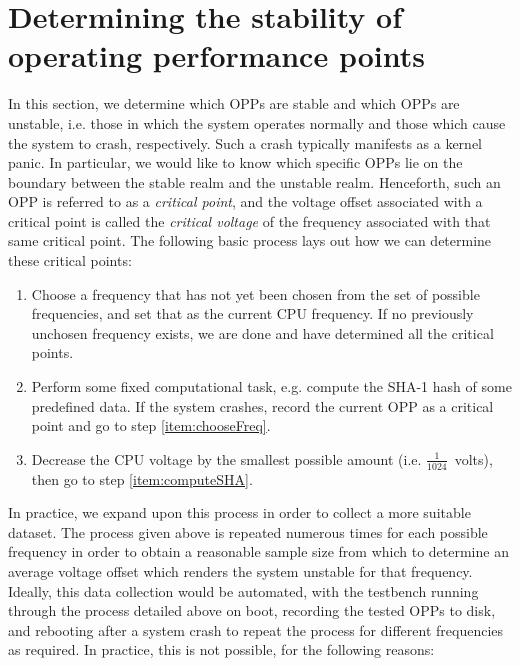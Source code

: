 \section{Determining the stability of operating performance points}
\label{sec:unstableOPPs}

In this section, we determine which OPPs are stable and which OPPs are unstable,
i.e. those in which the system operates normally and those which cause the system
to crash, respectively. Such a crash typically manifests as a kernel panic.
In particular, we would like to know which specific OPPs lie on the boundary
between the stable realm and the unstable realm. Henceforth, such an OPP is
referred to as a \textit{critical point}, and the voltage offset associated
with a critical point is called the \textit{critical voltage} of the frequency
associated with that same critical point. The following basic process lays out
how we can determine these critical points:

\begin{enumerate}
    \item \label{item:chooseFreq} Choose a frequency that has not yet been
        chosen from the set of possible frequencies, and set that as the current
        CPU frequency. If no previously unchosen frequency exists, we are done
        and have determined all the critical points.
    \item \label{item:computeSHA} Perform some fixed computational task, e.g.
        compute the SHA-1 hash of some predefined data. If the system crashes,
        record the current OPP as a critical point and go to step
        \ref{item:chooseFreq}.
    \item \label{item:undervolt} Decrease the CPU voltage by the smallest
        possible amount (i.e. $\frac{1}{1024}$~volts), then go to step
        \ref{item:computeSHA}.
\end{enumerate}

In practice, we expand upon this process in order to collect a more suitable
dataset. The process given above is repeated numerous times for each possible
frequency in order to obtain a reasonable sample size from which to determine
an average voltage offset which renders the system unstable for that frequency.
Ideally, this data collection would be automated, with the testbench running
through the process detailed above on boot, recording the tested OPPs to disk,
and rebooting after a system crash to repeat the process for different
frequencies as required. In practice, this is not possible, for the following
reasons:

